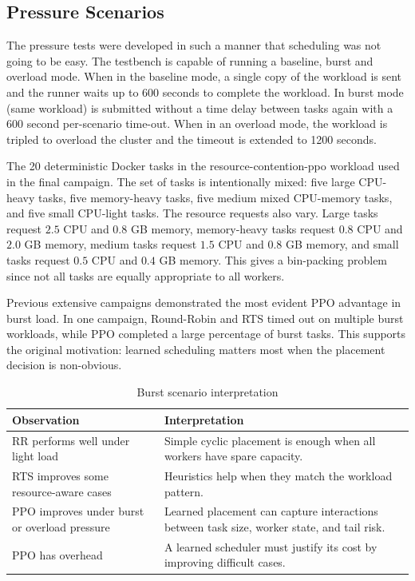 \subsection{Pressure Scenarios}

The pressure tests were developed in such a manner that scheduling was not going to be easy. The testbench is capable of running a baseline, burst and overload mode. When in the baseline mode, a single copy of the workload is sent and the runner waits up to 600 seconds to complete the workload. In burst mode (same workload) is submitted without a time delay between tasks again with a 600 second per-scenario time-out. When in an overload mode, the workload is tripled to overload the cluster and the timeout is extended to 1200 seconds.

The 20 deterministic Docker tasks in the resource-contention-ppo workload used in the final campaign. The set of tasks is intentionally mixed: five large CPU-heavy tasks, five memory-heavy tasks, five medium mixed CPU-memory tasks, and five small CPU-light tasks. The resource requests also vary. Large tasks request \(2.5\) CPU and \(0.8\) GB memory, memory-heavy tasks request \(0.8\) CPU and \(2.0\) GB memory, medium tasks request \(1.5\) CPU and \(0.8\) GB memory, and small tasks request \(0.5\) CPU and \(0.4\) GB memory. This gives a bin-packing problem since not all tasks are equally appropriate to all workers.

Previous extensive campaigns demonstrated the most evident PPO advantage in burst load. In one campaign, Round-Robin and RTS timed out on multiple burst workloads, while PPO completed a large percentage of burst tasks. This supports the original motivation: learned scheduling matters most when the placement decision is non-obvious.

\begin{table}[H]
\centering
\caption{Burst scenario interpretation}
\label{tab:burst_interpretation}
\begin{tabularx}{\textwidth}{lX}
\toprule
\textbf{Observation} & \textbf{Interpretation} \\
\midrule
RR performs well under light load & Simple cyclic placement is enough when all workers have spare capacity. \\
RTS improves some resource-aware cases & Heuristics help when they match the workload pattern. \\
PPO improves under burst or overload pressure & Learned placement can capture interactions between task size, worker state, and tail risk. \\
PPO has overhead & A learned scheduler must justify its cost by improving difficult cases. \\
\bottomrule
\end{tabularx}
\end{table}

